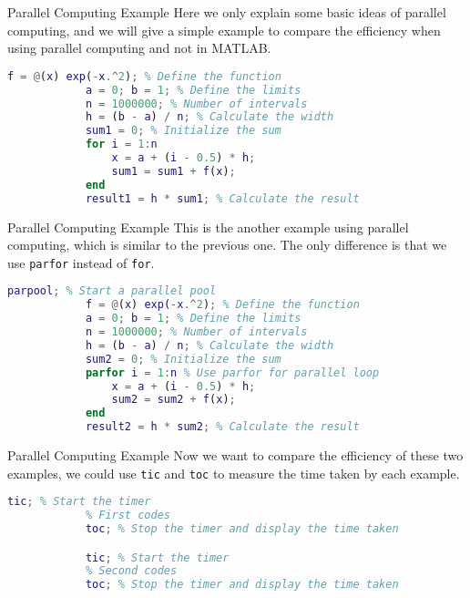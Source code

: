\documentclass[aspectratio=169]{beamer}
\begin{document}
    \begin{frame}[fragile]{Parallel Computing Example}
        Here we only explain some basic ideas of parallel computing, and we will give a simple example to compare the efficiency when using parallel computing and not in MATLAB.\par
        \begin{lstlisting}[language=Matlab]
            f = @(x) exp(-x.^2); % Define the function
            a = 0; b = 1; % Define the limits
            n = 1000000; % Number of intervals
            h = (b - a) / n; % Calculate the width
            sum1 = 0; % Initialize the sum
            for i = 1:n
                x = a + (i - 0.5) * h;
                sum1 = sum1 + f(x);
            end
            result1 = h * sum1; % Calculate the result
        \end{lstlisting}
    \end{frame}

    \begin{frame}[fragile]{Parallel Computing Example}
        This is the another example using parallel computing, which is similar to the previous one. The only difference is that we use \texttt{parfor} instead of \texttt{for}.\par
        \begin{lstlisting}[language=Matlab]
            parpool; % Start a parallel pool
            f = @(x) exp(-x.^2); % Define the function
            a = 0; b = 1; % Define the limits
            n = 1000000; % Number of intervals
            h = (b - a) / n; % Calculate the width
            sum2 = 0; % Initialize the sum
            parfor i = 1:n % Use parfor for parallel loop
                x = a + (i - 0.5) * h;
                sum2 = sum2 + f(x);
            end
            result2 = h * sum2; % Calculate the result
        \end{lstlisting}
    \end{frame}

    \begin{frame}[fragile]{Parallel Computing Example}
        Now we want to compare the efficiency of these two examples, we could use \texttt{tic} and \texttt{toc} to measure the time taken by each example.\par
        \begin{lstlisting}[language=Matlab]
            tic; % Start the timer
            % First codes
            toc; % Stop the timer and display the time taken

            tic; % Start the timer
            % Second codes
            toc; % Stop the timer and display the time taken
        \end{lstlisting}
    \end{frame}
\end{document}
